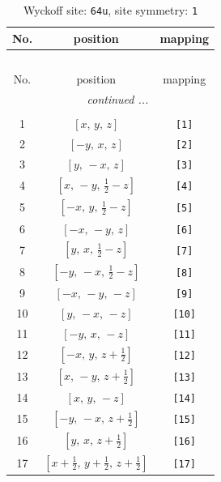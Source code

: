 \documentclass[fleqn,8pt]{jsarticle}
\begin{document}
\begin{longtable}{ccc}
\caption{Wyckoff site: {\tt 64u}, site symmetry: {\tt 1}}
 \\
 \hline \hline
No. & position & mapping \\ \hline \endfirsthead

\multicolumn{2}{l}{\tablename\ \thetable{}} \\
 \hline \hline
No. & position & mapping \\ \hline \endhead

 \hline \hline
\multicolumn{2}{r}{\footnotesize\it continued ...} \\ \endfoot

 \hline \hline
\multicolumn{2}{r}{} \\ \endlastfoot

1 & $\left[ x,\, y,\, z \right]$ & {\tt [1]} \\ \hline
2 & $\left[ - y,\, x,\, z \right]$ & {\tt [2]} \\ \hline
3 & $\left[ y,\, - x,\, z \right]$ & {\tt [3]} \\ \hline
4 & $\left[ x,\, - y,\, \frac{1}{2} - z \right]$ & {\tt [4]} \\ \hline
5 & $\left[ - x,\, y,\, \frac{1}{2} - z \right]$ & {\tt [5]} \\ \hline
6 & $\left[ - x,\, - y,\, z \right]$ & {\tt [6]} \\ \hline
7 & $\left[ y,\, x,\, \frac{1}{2} - z \right]$ & {\tt [7]} \\ \hline
8 & $\left[ - y,\, - x,\, \frac{1}{2} - z \right]$ & {\tt [8]} \\ \hline
9 & $\left[ - x,\, - y,\, - z \right]$ & {\tt [9]} \\ \hline
10 & $\left[ y,\, - x,\, - z \right]$ & {\tt [10]} \\ \hline
11 & $\left[ - y,\, x,\, - z \right]$ & {\tt [11]} \\ \hline
12 & $\left[ - x,\, y,\, z + \frac{1}{2} \right]$ & {\tt [12]} \\ \hline
13 & $\left[ x,\, - y,\, z + \frac{1}{2} \right]$ & {\tt [13]} \\ \hline
14 & $\left[ x,\, y,\, - z \right]$ & {\tt [14]} \\ \hline
15 & $\left[ - y,\, - x,\, z + \frac{1}{2} \right]$ & {\tt [15]} \\ \hline
16 & $\left[ y,\, x,\, z + \frac{1}{2} \right]$ & {\tt [16]} \\ \hline
17 & $\left[ x + \frac{1}{2},\, y + \frac{1}{2},\, z + \frac{1}{2} \right]$ & {\tt [17]} \\ \hline

\end{longtable}
\end{document}
